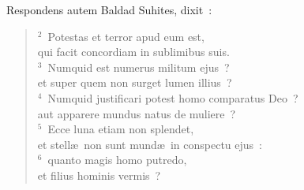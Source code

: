 \lettrine[lines=10,image=true,loversize=0.05,lraise=-0.03]{R}{}espondens autem Baldad Suhites, dixit~:
\begin{flushleft}\begin{verse}\vspace{6pt}${}^{2}$~Potestas et terror apud eum est,\\ qui facit concordiam in sublimibus suis.\\
${}^{3}$~Numquid est numerus militum ejus~?\\ et super quem non surget lumen illius~?\\
${}^{4}$~Numquid justificari potest homo comparatus Deo~?\\ aut apparere mundus natus de muliere~?\\
${}^{5}$~Ecce luna etiam non splendet,\\ et stell\ae\ non sunt mund\ae\ in conspectu ejus~:\\
${}^{6}$~quanto magis homo putredo,\\ et filius hominis vermis~?\end{verse}\end{flushleft}



